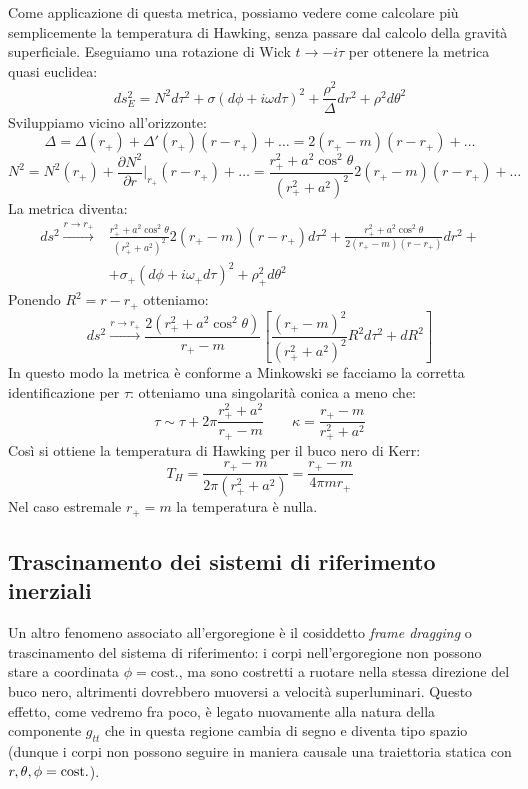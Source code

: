 Come applicazione di questa metrica, possiamo vedere come calcolare più semplicemente la temperatura di Hawking, senza passare dal calcolo della gravità superficiale.
Eseguiamo una rotazione di Wick $t \rightarrow -i\tau$ per ottenere la metrica quasi euclidea:
\begin{equation*}
    ds_E^2 = N^2 d\tau^2 + \sigma(d\phi +i \omega d\tau)^2 + \frac{\rho^2}{\Delta}dr^2 + \rho^2 d\theta^2 
\end{equation*}
Sviluppiamo vicino all'orizzonte:
\begin{equation*}
    \Delta = \Delta(r_+) + \Delta'(r_+)(r-r_+) + \dots = 2(r_+ -m)(r-r_+) + \dots
\end{equation*}
\begin{equation*}
    N^2 = N^2(r_+) + \frac{\partial N^2}{\partial r}\Big|_{r_+}(r-r_+) + \dots =\frac{r_+^2 + a^2\cos^2\theta}{(r_+^2 + a^2)^2}2(r_+ - m)(r- r_+) + \dots
\end{equation*}
La metrica diventa:
\begin{align*}
    ds^2 \xrightarrow{r \rightarrow r_+} &\frac{r_+^2 + a^2\cos^2\theta}{(r_+^2 + a^2)^2}2(r_+ - m)(r- r_+) d\tau^2 + \frac{r_+^2 + a^2\cos^2\theta}{2(r_+ - m)(r- r_+)}dr^2 + \\
    & + \sigma_+(d\phi + i\omega_+ d\tau)^2 + \rho_+^2 d\theta^2
\end{align*}
Ponendo $R^2 = r- r_+$ otteniamo:
\begin{equation*}
    ds^2 \xrightarrow{r \rightarrow r_+} \frac{2(r_+^2 + a^2\cos^2\theta)}{r_+ - m}\left[ \frac{(r_+ -m)^2}{(r_+^2+ a^2)^2}R^2d\tau^2 + dR^2\right]
\end{equation*}
In questo modo la metrica è conforme a Minkowski se facciamo la corretta identificazione per $\tau$: otteniamo una singolarità conica a meno che:
\begin{equation*}
    \tau \sim \tau + 2\pi\frac{r_+^2 + a^2}{r_+ - m} \qquad \kappa = \frac{r_+-m}{r_+^2+a^2}
\end{equation*}
Così si ottiene la temperatura di Hawking per il buco nero di Kerr:
\begin{equation}
    T_H = \frac{r_+ - m}{2\pi(r_+^2 + a^2)} = \frac{r_+ - m}{4\pi m r_+}
    \label{eq.temp_hawking_kerr}
\end{equation}
Nel caso estremale $r_+ = m$ la temperatura è nulla.
\subsection{Trascinamento dei sistemi di riferimento inerziali}
Un altro fenomeno associato all'ergoregione è il cosiddetto \textit{frame dragging} o trascinamento del sistema di riferimento: i corpi nell'ergoregione non possono stare a coordinata $\phi = \textrm{cost.}$, ma sono costretti a ruotare nella stessa direzione del buco nero, altrimenti dovrebbero muoversi a velocità superluminari.
Questo effetto, come vedremo fra poco, è legato nuovamente alla natura della componente $g_{tt}$ che in questa regione cambia di segno e diventa tipo spazio (dunque i corpi non possono seguire in maniera causale una traiettoria statica con $r, \theta, \phi = \textrm{cost.}$).

